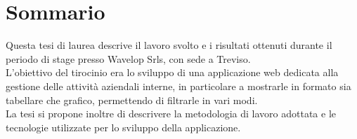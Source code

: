 
\cleardoublepage
{}
{}
\begingroup
\let\clearpage\relax
\let\cleardoublepage\relax
\let\cleardoublepage\relax

\chapter*{Sommario}

Questa tesi di laurea descrive il lavoro svolto e i risultati ottenuti durante il periodo di stage presso Wavelop Srls, con sede a Treviso.\\
L'obiettivo del tirocinio era lo sviluppo di una applicazione web dedicata alla gestione delle attività aziendali interne, in particolare a mostrarle in formato sia tabellare che grafico, permettendo di filtrarle in vari modi. \\
La tesi si propone inoltre di descrivere la metodologia di lavoro adottata e le tecnologie utilizzate per lo sviluppo della applicazione. 

%
%

\endgroup			

\vfill

